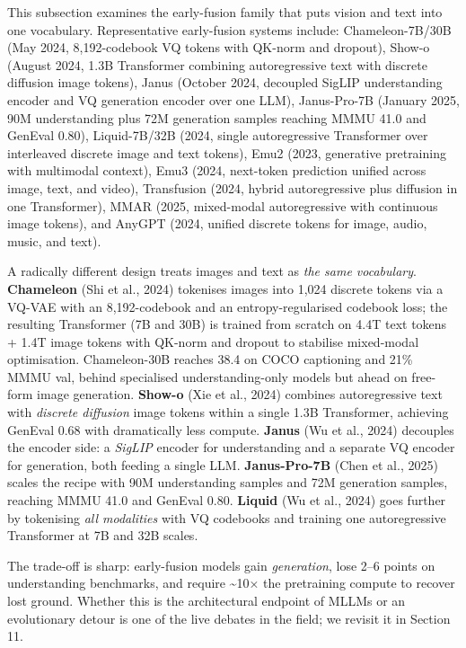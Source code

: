 This subsection examines the early-fusion family that puts vision and text into one vocabulary. Representative early-fusion systems include: Chameleon-7B/30B (May 2024, 8,192-codebook VQ tokens with QK-norm and dropout), Show-o (August 2024, 1.3B Transformer combining autoregressive text with discrete diffusion image tokens), Janus (October 2024, decoupled SigLIP understanding encoder and VQ generation encoder over one LLM), Janus-Pro-7B (January 2025, 90M understanding plus 72M generation samples reaching MMMU 41.0 and GenEval 0.80), Liquid-7B/32B (2024, single autoregressive Transformer over interleaved discrete image and text tokens), Emu2 (2023, generative pretraining with multimodal context), Emu3 (2024, next-token prediction unified across image, text, and video), Transfusion (2024, hybrid autoregressive plus diffusion in one Transformer), MMAR (2025, mixed-modal autoregressive with continuous image tokens), and AnyGPT (2024, unified discrete tokens for image, audio, music, and text).

A radically different design treats images and text as \emph{the same vocabulary}. \textbf{Chameleon} (Shi et al., 2024) tokenises images into 1,024 discrete tokens via a VQ-VAE with an 8,192-codebook and an entropy-regularised codebook loss; the resulting Transformer (7B and 30B) is trained from scratch on 4.4T text tokens + 1.4T image tokens with QK-norm and dropout to stabilise mixed-modal optimisation. Chameleon-30B reaches 38.4 on COCO captioning and 21\% MMMU val, behind specialised understanding-only models but ahead on free-form image generation. \textbf{Show-o} (Xie et al., 2024) combines autoregressive text with \emph{discrete diffusion} image tokens within a single 1.3B Transformer, achieving GenEval 0.68 with dramatically less compute. \textbf{Janus} (Wu et al., 2024) decouples the encoder side: a \emph{SigLIP} encoder for understanding and a separate VQ encoder for generation, both feeding a single LLM. \textbf{Janus-Pro-7B} (Chen et al., 2025) scales the recipe with 90M understanding samples and 72M generation samples, reaching MMMU 41.0 and GenEval 0.80. \textbf{Liquid} (Wu et al., 2024) goes further by tokenising \emph{all modalities} with VQ codebooks and training one autoregressive Transformer at 7B and 32B scales.

The trade-off is sharp: early-fusion models gain \emph{generation}, lose 2--6 points on understanding benchmarks, and require \textasciitilde10× the pretraining compute to recover lost ground. Whether this is the architectural endpoint of MLLMs or an evolutionary detour is one of the live debates in the field; we revisit it in Section 11.

